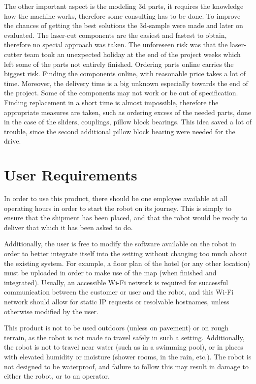 \documentclass[11pt]{article}
\begin{document}
The other important aspect is the modeling 3d parts, it requires the knowledge how the machine works, therefore some consulting has to be done. To improve the chances of getting the best solutions the 3d-sample were made and later on evaluated. The laser-cut components are the easiest and fastest to obtain, therefore no special approach was taken. The unforeseen risk was that the laser-cutter team took an unexpected holiday at the end of the project weeks which left some of the parts not entirely finished. Ordering parts online carries the biggest risk. Finding the components online, with reasonable price takes a lot of time. Moreover, the delivery time is a big unknown especially towards the end of the project. Some of the components may not work or be out of specification. Finding replacement in a short time is almost impossible, therefore the appropriate measures are taken, such as ordering excess of the needed parts, done in the case of the sliders, couplings, pillow block bearings. This idea saved a lot of trouble, since the second additional pillow block bearing were needed for the drive.
\newpage
\section{User Requirements}
In order to use this product, there should be one employee available at all operating hours in order to start the robot on its journey. This is simply to ensure that the shipment has been placed, and that the robot would be ready to deliver that which it has been asked to do.


Additionally, the user is free to modify the software available on the robot in order to better integrate itself into the setting without changing too much about the existing system. For example, a floor plan of the hotel (or any other location) must be uploaded in order to make use of the map (when finished and integrated). Usually, an accessible Wi-Fi network is required for successful communication between the customer or user and the robot, and this Wi-Fi network should allow for static IP requests or resolvable hostnames, unless otherwise modified by the user.


This product is not to be used outdoors (unless on pavement) or on rough terrain, as the robot is not made to travel safely in such a setting. Additionally, the robot is not to travel near water (such as in a swimming pool), or in places with elevated humidity or moisture (shower rooms, in the rain, etc.). The robot is not designed to be waterproof, and failure to follow this may result in damage to either the robot, or to an operator.
\end{document}
